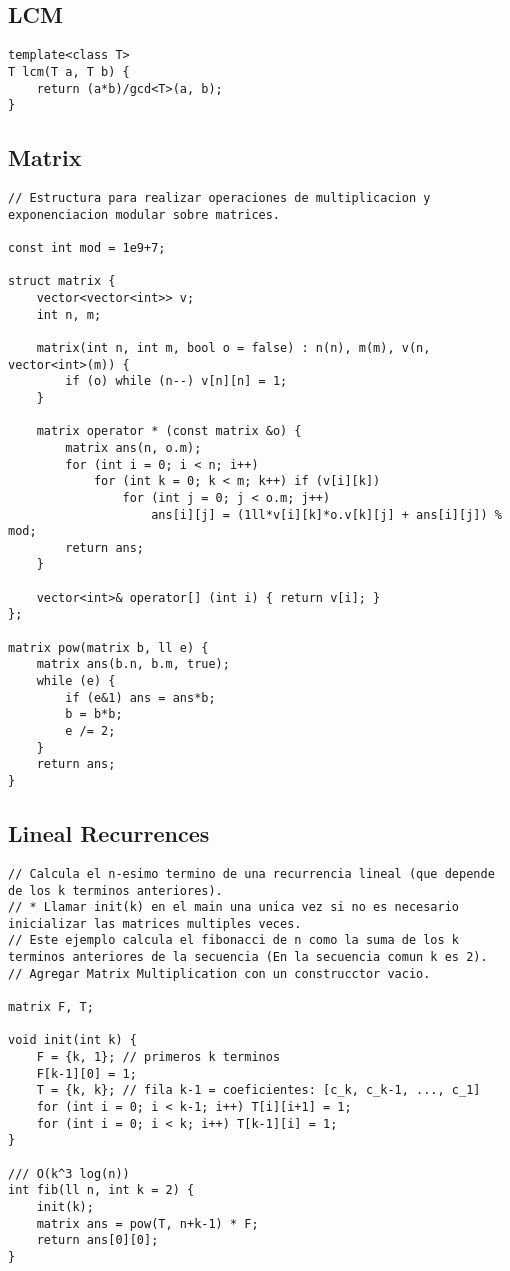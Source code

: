 \documentclass[10pt,letterpaper,twocolumn,twosided]{article}
\begin{document}
\subsection{LCM}
\begin{lstlisting}
template<class T>
T lcm(T a, T b) {  
    return (a*b)/gcd<T>(a, b);  
}
\end{lstlisting}

\subsection{Matrix}
\begin{lstlisting}
// Estructura para realizar operaciones de multiplicacion y exponenciacion modular sobre matrices.

const int mod = 1e9+7;

struct matrix {
    vector<vector<int>> v;
    int n, m;
    
    matrix(int n, int m, bool o = false) : n(n), m(m), v(n, vector<int>(m)) {
        if (o) while (n--) v[n][n] = 1;
    }

    matrix operator * (const matrix &o) {
        matrix ans(n, o.m);
        for (int i = 0; i < n; i++)
            for (int k = 0; k < m; k++) if (v[i][k])
                for (int j = 0; j < o.m; j++)
                    ans[i][j] = (1ll*v[i][k]*o.v[k][j] + ans[i][j]) % mod;
        return ans;
    }
    
    vector<int>& operator[] (int i) { return v[i]; }
};

matrix pow(matrix b, ll e) {
    matrix ans(b.n, b.m, true);
    while (e) {
        if (e&1) ans = ans*b;
        b = b*b;
        e /= 2;
    }
    return ans;
}
\end{lstlisting}

\subsection{Lineal Recurrences}
\begin{lstlisting}
// Calcula el n-esimo termino de una recurrencia lineal (que depende de los k terminos anteriores).
// * Llamar init(k) en el main una unica vez si no es necesario inicializar las matrices multiples veces.
// Este ejemplo calcula el fibonacci de n como la suma de los k terminos anteriores de la secuencia (En la secuencia comun k es 2).
// Agregar Matrix Multiplication con un construcctor vacio.

matrix F, T;

void init(int k) {
    F = {k, 1}; // primeros k terminos
    F[k-1][0] = 1;
    T = {k, k}; // fila k-1 = coeficientes: [c_k, c_k-1, ..., c_1]
    for (int i = 0; i < k-1; i++) T[i][i+1] = 1;
    for (int i = 0; i < k; i++) T[k-1][i] = 1;
}

/// O(k^3 log(n))
int fib(ll n, int k = 2) {
    init(k);
    matrix ans = pow(T, n+k-1) * F;
    return ans[0][0];
}
\end{lstlisting}
\end{document}

